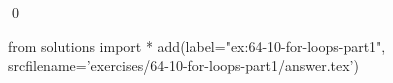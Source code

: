 
\begin{ex}
  \label{ex:64-10-for-loops-part1}
  
  \qed
\end{ex}
\begin{python0}
from solutions import *
add(label="ex:64-10-for-loops-part1",
    srcfilename='exercises/64-10-for-loops-part1/answer.tex')
\end{python0}
